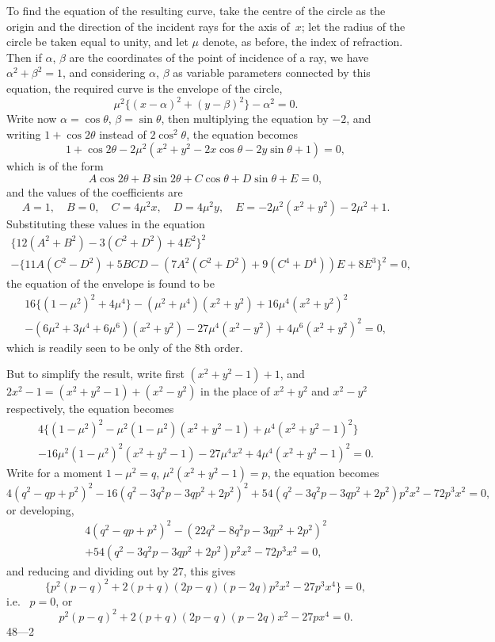 \documentclass[12pt,a4paper]{article}
\theoremstyle{definition}
\newcommand{\ie}{i.e.\ }
\begin{document}
To find the equation of the resulting curve, take the centre
of the circle as the origin and the direction of the incident
rays for the axis of~$x$; let the radius of the circle be taken
equal to unity, and let $\mu$ denote, as before, the index of refraction.
Then if $\alpha$, $\beta$ are the coordinates of the point of incidence
of a ray, we have $\alpha^{2} + \beta^{2} = 1$, and considering $\alpha$,
$\beta$ as variable parameters connected by this equation, the
required curve is the envelope of the circle,
\[
\mu^{2} \{ (x - \alpha)^{2} + (y - \beta)^{2} \} - \alpha^{2} = 0.
\]
Write now $\alpha = \cos\theta$, $\beta = \sin\theta$, then multiplying the
equation by $-2$, and writing $1 + \cos 2\theta$ instead of $2\cos^{2}\theta$,
the equation becomes
\[
1 + \cos 2\theta - 2\mu^{2}(x^{2} + y^{2} - 2x\cos\theta - 2y\sin\theta + 1) = 0,
\]
which is of the form
\[
A\cos 2\theta + B\sin 2\theta + C\cos\theta + D\sin\theta + E = 0,
\]
and the values of the coefficients are
\[
A = 1, \quad B = 0, \quad C = 4\mu^{2}x, \quad D = 4\mu^{2}y, \quad
E = -2\mu^{2}(x^{2} + y^{2}) - 2\mu^{2} + 1.
\]
Substituting these values in the equation
\begin{multline*}
\{ 12(A^{2} + B^{2}) - 3(C^{2} + D^{2}) + 4E^{2} \}^{2} \\
- \{ 11A(C^{2} - D^{2}) + 5BCD - (7A^{2}(C^{2} + D^{2}) + 9(C^{4} + D^{4}))E + 8E^{3} \}^{2}
= 0,
\end{multline*}
the equation of the envelope is found to be
\begin{multline*}
16\{ (1 - \mu^{2})^{2} + 4\mu^{4} \} - (\mu^{2} + \mu^{4})(x^{2} + y^{2})
+ 16\mu^{4}(x^{2} + y^{2})^{2} \\
- (6\mu^{2} + 3\mu^{4} + 6\mu^{6})(x^{2} + y^{2}) - 27\mu^{4}(x^{2} - y^{2})
+ 4\mu^{6}(x^{2} + y^{2})^{2} = 0,
\end{multline*}
which is readily seen to be only of the 8th order.

But to simplify the result, write first
$(x^{2} + y^{2} - 1) + 1$, and $2x^{2} - 1 = (x^{2} + y^{2} - 1) + (x^{2} - y^{2})$
in the place of $x^{2} + y^{2}$ and $x^{2} - y^{2}$ respectively,
the equation becomes
\begin{multline*}
4\{ (1 - \mu^{2})^{2} - \mu^{2}(1 - \mu^{2})(x^{2} + y^{2} - 1)
+ \mu^{4}(x^{2} + y^{2} - 1)^{2} \} \\
- 16\mu^{2}(1 - \mu^{2})^{2}(x^{2} + y^{2} - 1) - 27\mu^{4}x^{2}
+ 4\mu^{4}(x^{2} + y^{2} - 1)^{2} = 0.
\end{multline*}
Write for a moment $1 - \mu^{2} = q$,
$\mu^{2}(x^{2} + y^{2} - 1) = p$, the equation becomes
\[
4(q^{2} - qp + p^{2})^{2} - 16(q^{2} - 3q^{2}p - 3qp^{2} + 2p^{2})^{2}
+ 54(q^{2} - 3q^{2}p - 3qp^{2} + 2p^{2})p^{2}x^{2} - 72p^{3}x^{2} = 0,
\]
or developing,
\begin{multline*}
4(q^{2} - qp + p^{2})^{2} - (22q^{2} - 8q^{2}p - 3qp^{2} + 2p^{2})^{2} \\
+ 54(q^{2} - 3q^{2}p - 3qp^{2} + 2p^{2})p^{2}x^{2} - 72p^{3}x^{2} = 0,
\end{multline*}
and reducing and dividing out by $27$, this gives
\[
\{ p^{2}(p - q)^{2} + 2(p + q)(2p - q)(p - 2q)p^{2}x^{2} - 27p^{3}x^{4} \} = 0,
\]
\ie{} $p = 0$, or
\[
p^{2}(p - q)^{2} + 2(p + q)(2p - q)(p - 2q)x^{2} - 27px^{4} = 0.
\]
48---2
\end{document}
